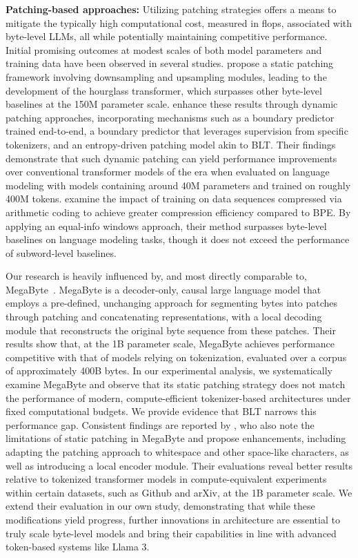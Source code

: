 \textbf{Patching-based approaches:} Utilizing patching strategies offers a means to mitigate the typically high computational cost, measured in flops, associated with byte-level LLMs, all while potentially maintaining competitive performance. Initial promising outcomes at modest scales of both model parameters and training data have been observed in several studies. \cite{nawrot-etal-2022-hierarchical} propose a static patching framework involving downsampling and upsampling modules, leading to the development of the hourglass transformer, which surpasses other byte-level baselines at the 150M parameter scale. \cite{nawrot-etal-2023-efficient} enhance these results through dynamic patching approaches, incorporating mechanisms such as a boundary predictor trained end-to-end, a boundary predictor that leverages supervision from specific tokenizers, and an entropy-driven patching model akin to {\textsc BLT}. Their findings demonstrate that such dynamic patching can yield performance improvements over conventional transformer models of the era when evaluated on language modeling with models containing around 40M parameters and trained on roughly 400M tokens. \cite{lester2024training} examine the impact of training on data sequences compressed via arithmetic coding to achieve greater compression efficiency compared to BPE. By applying an equal-info windows approach, their method surpasses byte-level baselines on language modeling tasks, though it does not exceed the performance of subword-level baselines.

Our research is heavily influenced by, and most directly comparable to, MegaByte~\citep{yu2023megabyte}. MegaByte is a decoder-only, causal large language model that employs a pre-defined, unchanging approach for segmenting bytes into patches through patching and concatenating representations, with a local decoding module that reconstructs the original byte sequence from these patches. Their results show that, at the 1B parameter scale, MegaByte achieves performance competitive with that of models relying on tokenization, evaluated over a corpus of approximately 400B bytes. In our experimental analysis, we systematically examine MegaByte and observe that its static patching strategy does not match the performance of modern, compute-efficient tokenizer-based architectures under fixed computational budgets. We provide evidence that {\textsc BLT} narrows this performance gap. Consistent findings are reported by \cite{slagle2024spacebyte}, who also note the limitations of static patching in MegaByte and propose enhancements, including adapting the patching approach to whitespace and other space-like characters, as well as introducing a local encoder module. Their evaluations reveal better results relative to tokenized transformer models in compute-equivalent experiments within certain datasets, such as Github and arXiv, at the 1B parameter scale. We extend their evaluation in our own study, demonstrating that while these modifications yield progress, further innovations in architecture are essential to truly scale byte-level models and bring their capabilities in line with advanced token-based systems like Llama 3.

